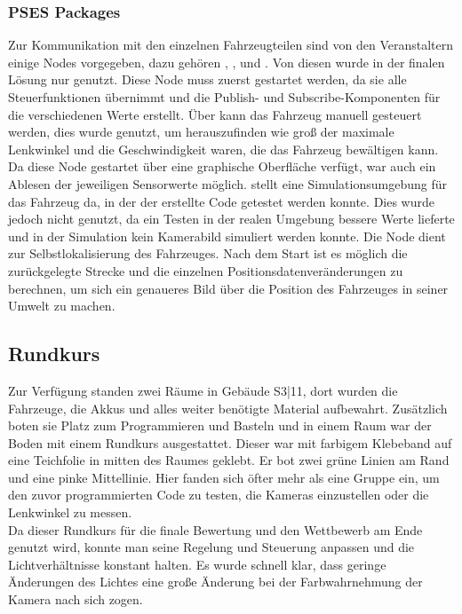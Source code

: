 \subsubsection{PSES Packages}
\label{sec:psespackages}
Zur Kommunikation mit den einzelnen Fahrzeugteilen sind von den Veranstaltern einige Nodes vorgegeben, dazu gehören , ,  und . Von diesen wurde in der finalen Lösung nur  genutzt. Diese Node muss zuerst gestartet werden, da sie alle Steuerfunktionen übernimmt und die Publish- und Subscribe-Komponenten für die verschiedenen Werte erstellt. 
Über  kann das Fahrzeug manuell gesteuert werden, dies wurde genutzt, um herauszufinden wie groß der maximale Lenkwinkel und die Geschwindigkeit waren, die das Fahrzeug bewältigen kann. Da diese Node gestartet über eine graphische Oberfläche verfügt, war auch ein Ablesen der jeweiligen Sensorwerte möglich.  stellt eine Simulationsumgebung für das Fahrzeug da, in der der erstellte Code getestet werden konnte. Dies wurde jedoch nicht genutzt, da ein Testen in der realen Umgebung bessere Werte lieferte und in der Simulation kein Kamerabild simuliert werden konnte. 
Die Node  dient zur Selbstlokalisierung des Fahrzeuges. Nach dem Start ist es möglich die zurückgelegte Strecke und die einzelnen Positionsdatenveränderungen zu berechnen, um sich ein genaueres Bild über die Position des Fahrzeuges in seiner Umwelt zu machen.

\subsection{Rundkurs}
\label{sec:rundkurs}
Zur Verfügung standen zwei Räume in Gebäude S3|11, dort wurden die Fahrzeuge, die Akkus und alles weiter benötigte Material aufbewahrt. Zusätzlich boten sie Platz zum Programmieren und Basteln und in einem Raum war der Boden mit einem Rundkurs ausgestattet. Dieser war mit farbigem Klebeband auf eine Teichfolie in mitten des Raumes geklebt. Er bot zwei grüne Linien am Rand und eine pinke Mittellinie. Hier fanden sich öfter mehr als eine Gruppe ein, um den zuvor programmierten Code zu testen, die Kameras einzustellen oder die Lenkwinkel zu messen. \\
Da dieser Rundkurs für die finale Bewertung und den Wettbewerb am Ende genutzt wird, konnte man seine Regelung und Steuerung anpassen und die Lichtverhältnisse konstant halten. Es wurde schnell klar, dass geringe Änderungen des Lichtes eine große Änderung bei der Farbwahrnehmung der Kamera nach sich zogen. 
